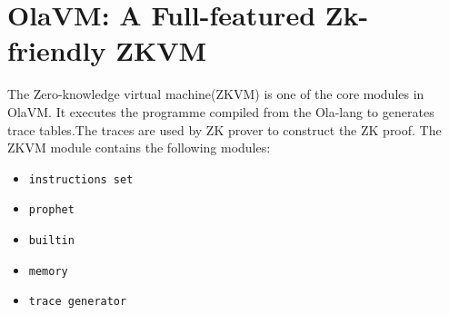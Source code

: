 \section{OlaVM: A Full-featured Zk-friendly ZKVM}\label{sec:ola-vm-a-full-featured-zk-friendly-zkvm}
The Zero-knowledge virtual machine(ZKVM) is one of the core modules in OlaVM. It executes the programme compiled from the Ola-lang to generates trace tables.The traces are used by ZK prover to construct the ZK proof.
The ZKVM module contains the following modules:
\begin{itemize}
    \item \verb|instructions set|
    \item \verb|prophet|
    \item \verb|builtin|
    \item \verb|memory|
    \item \verb|trace generator|
\end{itemize}


